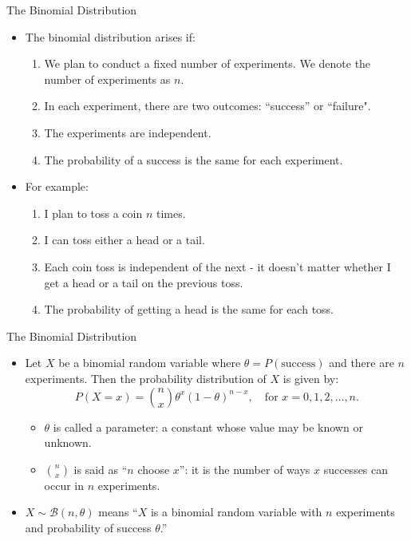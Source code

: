 \documentclass[10pt, handout, xcolor=table]{beamer}
\newcommand*\themecol{\usebeamercolor[fg]{structure}}
\begin{document}
\begin{frame}{The Binomial Distribution}
\begin{itemize}
\setlength{\itemsep}{15pt}
\item The {\themecol binomial distribution} arises if:
\begin{enumerate}
\vspace{0.25cm}
\setlength{\itemsep}{6pt}
\item<2-> We plan to conduct a fixed number of experiments. We denote the number of experiments as $n$.
\item<3-6,8-> In each experiment, there are two outcomes: ``success'' or ``failure".
\item<4-6, 9-> The experiments are independent.
\item<5-6, 10-> The probability of a success is the same for each experiment.
\end{enumerate}
\item<6-> For example: 
\begin{enumerate} \color{blue!70}
\vspace{0.25cm}
\setlength{\itemsep}{6pt}
\item<7-> I plan to toss a coin $n$ times.
\item<8-> I can toss either a head or a tail.
\item<9-> Each coin toss is independent of the next - it doesn't matter whether I get a head or a tail on the previous toss.
\item<10-> The probability of getting a head is the same for each toss.
\end{enumerate}
\end{itemize}
\end{frame}

\begin{frame}{The Binomial Distribution}
\begin{itemize}
\setlength{\itemsep}{15pt}
\item Let $X$ be a binomial random variable where $\theta = P(\text{success})$ and there are $n$ experiments. Then the probability distribution of $X$ is given by:
$$ P(X = x) = {n \choose x} \theta^x (1-\theta)^{n-x}, \quad \text{for } x = 0, 1, 2, \dots, n.$$
\begin{itemize}
\setlength{\itemsep}{6pt}
\item<2-> $\theta$ is called a {\themecol parameter}: a constant whose value may be known or unknown.
\item<3-> ${n \choose x}$ is said as ``$n$ choose $x$'': it is the number of ways $x$ successes can occur in $n$ experiments.
\end{itemize}
\item<4->[Note:] $X \sim \mathcal{B}(n, \theta)$ means ``$X$ is a binomial random variable with $n$ experiments and probability of success $\theta$.''
\end{itemize}
\end{frame}
\end{document}
